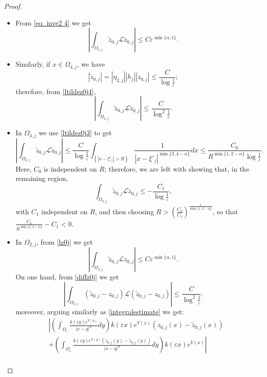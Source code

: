 \documentclass[11pt]{article}
\begin{document}
\begin{proof}
\begin{itemize}
\item From \eqref{eq. inve2 4} we get
$$\left|\int_{\Omega_{1,j}}\widetilde z_{0,j}\mathcal L\widetilde z_{0,j}\right|\le C\varepsilon^{\min\{\alpha,1\}}.$$
\item Similarly, if $x\in\Omega_{4,j}$, we have
$$|\widetilde z_{0,j}|=|\eta_{2,j}||h_j||z_{0,j}|\le\frac C{\log\frac1\varepsilon};$$
therefore, from \eqref{ltildez0j4},
$$\left|\int_{\Omega_{4,j}}\widetilde z_{0,j}\mathcal L\widetilde z_{0,j}\right|\le\frac C{\log^2\frac1\varepsilon}.$$
\item In $\Omega_{3,j}$ we use \eqref{ltildez0j3} to get
$$\left|\int_{\Omega_{3,j}}\widetilde z_{0,j}\mathcal L\widetilde z_{0,j}\right|\le\frac C{\log\frac1\varepsilon}\int_{\left\{\left|x-\xi'_j\right|>R\right\}}\frac1{\left|x-\xi'_j\right|^{\min\{3,4-\alpha\}}}dx\le\frac{C_0}{R^{\min\{1,2-\alpha\}}\log\frac1\varepsilon}.$$
Here, $C_0$ is independent on $R$; therefore, we are left with showing that, in the remaining region,
\begin{equation}\label{eq. inve2 8}
\int_{\Omega_{3,j}}\widetilde z_{0,j}\mathcal L\widetilde z_{0,j}\le-\frac{C_1}{\log\frac1\varepsilon},
\end{equation}
with $C_1$ independent on $R$, and then choosing $R>\left(\frac{C_0}{C_1}\right)^\frac1{\min\{1,2-\alpha\}}$, so that $\frac{C_0}{R^{\min\{1,2-\alpha\}}}-C_1<0$.
\item In $\Omega_{2,j}$, from \eqref{lz0j} we get
\begin{equation}\label{tildezlz}
\left|\int_{\Omega_{2,j}}\widetilde z_{0,j}\mathcal Lz_{0,j}\right|\le C\varepsilon^{\min\{\alpha,1\}}.
\end{equation}
On one hand, from \eqref{diffz0j} we get
\begin{equation}\label{diffldiff}
\left|\int_{\Omega_{2,j}}(\widetilde z_{0,j}-z_{0,j})\mathcal L(\widetilde z_{0,j}-z_{0,j})\right|\le\frac C{\log^2\frac1\varepsilon}.
\end{equation}
moreover, arguing similarly as \eqref{integralestimate} we get:
\begin{align}
\nonumber&\left|\left(\int_{\Omega_\varepsilon}\frac{k(\varepsilon y)e^{V(y)}}{|x-y|^\alpha}dy\right)k(\varepsilon x)e^{V(x)}(z_{0,j}(x)-\widetilde z_{0,j}(x))\right.\\
\nonumber&\left.+\left(\int_{\Omega_\varepsilon}\frac{k(\varepsilon y)e^{V(y)}(z_{0,j}(y)-\widetilde z_{0,j}(y))}{|x-y|^\alpha}dy\right)k(\varepsilon x)e^{V(x)}\right|\\

\end{align}
\end{itemize}
\end{proof}
\end{document}
